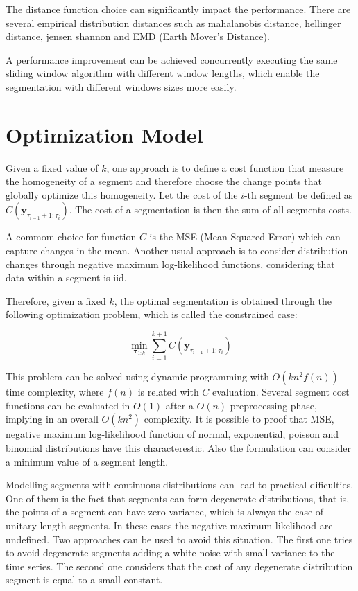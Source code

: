 The distance function choice can significantly impact the performance. There are several empirical distribution distances such as mahalanobis distance, hellinger distance, jensen shannon and EMD (Earth Mover's Distance).  

A performance improvement can be achieved concurrently executing the same sliding window algorithm with different window lengths, which enable the segmentation with different windows sizes more easily.

\section{Optimization Model}  

Given a fixed value of $k$, one approach is to define a cost function that measure the homogeneity of a segment and therefore choose the change points that globally optimize this homogeneity. Let the cost of the $i$-th segment be defined as $C(\mathbf{y}_{\tau_{i - 1} + 1 : \tau_{i}})$. The cost of a segmentation is then the sum of all segments costs.

A commom choice for function $C$ is the MSE (Mean Squared Error) which can capture changes in the mean. Another usual approach is to consider distribution changes through negative maximum log-likelihood functions, considering that data within a segment is iid. 

Therefore, given a fixed $k$, the optimal segmentation is obtained through the following optimization problem, which is called the constrained case: 

\begin{equation}
    \min_{\boldsymbol \tau_{1 : k}} \sum \limits_{i = 1}^{k + 1} C(\mathbf{y}_{\tau_{i - 1} + 1 : \tau_{i}})
\end{equation}

This problem can be solved using dynamic programming with $O(k n^2 f(n))$ time complexity, where $f(n)$ is related with $C$ evaluation. Several segment cost functions can be evaluated in $O(1)$ after a $O(n)$ preprocessing phase, implying in an overall $O(k n^2)$ complexity. It is possible to proof that MSE, negative maximum log-likelihood function of normal, exponential, poisson and binomial distributions have this characterestic. Also the formulation can consider a minimum value of a segment length.

Modelling segments with continuous distributions can lead to practical dificulties. One of them is the fact that segments can form degenerate distributions, that is, the points of a segment can have zero variance, which is always the case of unitary length segments. In these cases the negative maximum likelihood are undefined. Two approaches can be used to avoid this situation. The first one tries to avoid degenerate segments adding a white noise with small variance to the time series. The second one considers that the cost of any degenerate distribution segment is equal to a small constant.

